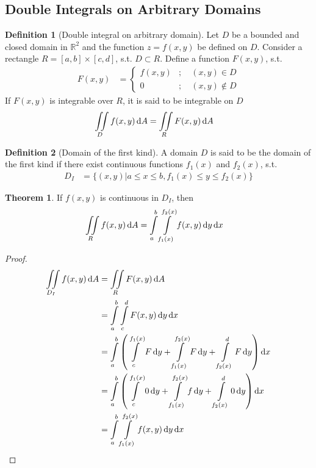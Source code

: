 \documentclass[fleqn, a4paper, 12pt]{article}
\theoremstyle{definition}
\newtheorem{definition}{Definition}
\theoremstyle{theorem}
\newtheorem{theorem}{Theorem}
\theoremstyle{remark}
\begin{document}
\subsection{Double Integrals on Arbitrary Domains}

\begin{definition}[Double integral on arbitrary domain]
	Let $D$ be a bounded and closed domain in $\mathbb{R}^2$ and the function $z = f(x,y)$ be defined on $D$. Consider a rectangle $R = [a,b] \times [c,d]$, s.t. $D \subset R$. Define a function $F(x,y)$, s.t.
	\begin{align*}
		F(x,y) &= 
			\begin{cases}
				f(x,y) &;\quad (x,y) \in D\\
				0 &;\quad (x,y) \notin D
			\end{cases}
	\end{align*}
	If $F(x,y)$ is integrable over $R$, it is said to be integrable on $D$
	\begin{align*}
		\iint\limits_{D} f(x,y) \dif A &= \iint\limits_{R} F(x,y) \dif A
	\end{align*}
\end{definition}

\begin{definition}[Domain of the first kind]
	A domain $D$ is said to be the domain of the first kind if there exist continuous functions $f_1(x)$ and $f_2(x)$, s.t.
	\begin{align*}
		D_{I} &= \{(x,y) | a \leq x \leq b, f_1(x) \leq y \leq f_2(x)\}
	\end{align*}
\end{definition}

\begin{theorem}
	If $f(x,y)$ is continuous in $D_{I}$, then
	\begin{align*}
		\iint\limits_{R} f(x,y) \dif A &= \int\limits_{a}^{b} \int\limits_{f_1(x)}^{f_2(x)} f(x,y) \dif y \dif x
	\end{align*}
\end{theorem}

\begin{proof}
	\begin{align*}
		\iint\limits_{D_{I}} f(x,y) \dif A &= \iint\limits_{R} F(x,y) \dif A\\
		&= \int\limits
		_{a}^{b} \int\limits_{c}^{d} F(x,y) \dif y \dif x\\
		&= \int\limits_{a}^{b} \left( \int\limits_{c}^{f_1(x)} F \dif y + \int\limits_{f_1(x)}^{f_2(x)} F \dif y + \int\limits_{f_2(x)}^{d} F \dif y \right) \dif x\\
		&= \int\limits_{a}^{b} \left( \int\limits_{c}^{f_1(x)} 0 \dif y + \int\limits_{f_1(x)}^{f_2(x)} f \dif y + \int\limits_{f_2(x)}^{d} 0 \dif y \right) \dif x\\
		&= \int\limits_{a}^{b} \int\limits_{f_1(x)}^{f_2(x)} f(x,y) \dif y \dif x
	\end{align*}
\end{proof}
\end{document}
